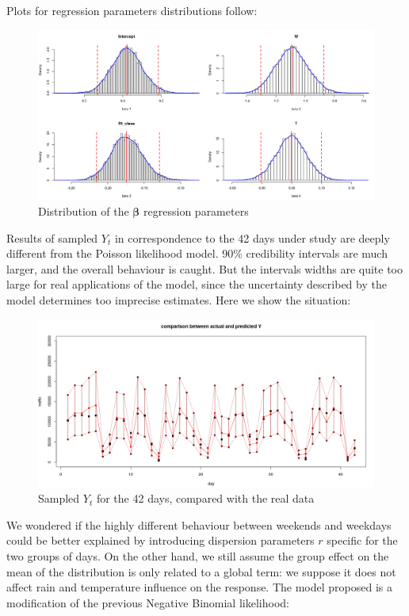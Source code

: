\documentclass[11pt,twoside]{report}
\begin{document}
Plots for regression parameters distributions follow:
\begin{figure}[H]
	\centering
	\includegraphics[width=120 mm]{pictures/negbin_single_r_beta.png}
	\caption{Distribution of the $\boldsymbol{\beta}$ regression parameters}
	\label{fig:nb_beta}
\end{figure}
Results of sampled $Y_t$ in correspondence to the 42 days under study are deeply different from the Poisson likelihood model. 90$\%$ credibility intervals are much larger, and the overall behaviour is caught. But the intervals widths are quite too large for real applications of the model, since the uncertainty described by the model determines too imprecise estimates. Here we show the situation:
\begin{figure}[H]
	\centering
	\includegraphics[width=120 mm]{pictures/negbin_single_r_pred.png}
	\caption{Sampled $Y_t$ for the 42 days, compared with the real data}
	\label{fig:nb_pred}
\end{figure}
We wondered if the highly different behaviour between weekends and weekdays could be better explained by introducing dispersion parameters $r$ specific for the two groups of days. On the other hand, we still assume the group effect on the mean of the distribution is only related to a global term: we suppose it does not affect rain and temperature influence on the response. The model proposed is a modification of the previous Negative Binomial likelihood:
\end{document}
